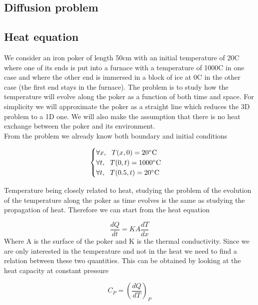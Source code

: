 \documentclass[10 pt]{article}
\numberwithin{equation}{section}
\begin{document}
\begin{multicols}{2}

\section{Diffusion problem}
\subsection{Heat equation}

We consider an iron poker of length 50cm with an initial temperature of 20\degree C where one of its ends is put into a furnace with a temperature of 1000\degree C in one case and where the other end is immersed in a block of ice at 0\degree C in the other case (the first end stays in the furnace). The problem is to study how the temperature will evolve along the poker as a function of both time and space. For simplicity we will approximate the poker as a straight line which reduces the 3D problem to a 1D one. We will also make the assumption that there is no heat exchange between the poker and its environment.\\
From the problem we already know both boundary and initial conditions

\begin{equation}
\begin{cases}
\forall x,\ \ T(x,0) = 20 ^\circ \textnormal{C}\\
\forall t, \ \ T(0,t) = 1000 ^\circ \textnormal{C}\\
\forall t, \ \ T(0.5,t) = 20 ^\circ \textnormal{C}
\end{cases}
\end{equation}

Temperature being closely related to heat, studying the problem of the evolution of the temperature along the poker as time evolves is the same as studying the propagation of heat. Therefore we can start from the heat equation \cite{HeatEq}

\begin{equation}
\frac{dQ}{dt} = K A \frac{dT}{dx}
\end{equation}
Where  A is the surface of the poker and K is the thermal conductivity. Since we are only interested in the temperature and not in the heat we need to find a relation between these two quantities. This can be obtained by looking at the heat capacity at constant pressure\cite{HeatEq}

\begin{equation}
C_P = \left ( \frac{dQ}{dT} \right )_P
\end{equation}


\end{multicols}
\end{document}
